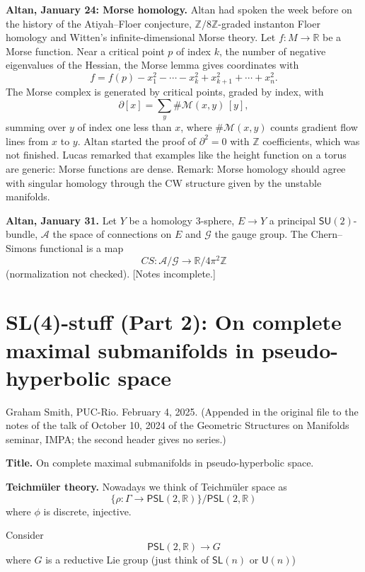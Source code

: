 \medskip\noindent
{\bf Altan, January 24: Morse homology.}
Altan had spoken the week before on the
history of the Atiyah--Floer conjecture,
$\mathbb{Z}/8\mathbb{Z}$-graded instanton
Floer homology and Witten's
infinite-dimensional Morse theory. Let
$f\colon M\to\mathbb{R}$ be a Morse
function. Near a critical point $p$ of index
$k$, the number of negative eigenvalues of
the Hessian, the Morse lemma gives
coordinates with
$$
f=f(p)-x_1^2-\cdots-x_k^2
+x_{k+1}^2+\cdots+x_n^2.
$$
The Morse complex is generated by critical
points, graded by index, with
$$
\partial[x]=\sum_y
\#\mathcal{M}(x,y)\,[y],
$$
summing over $y$ of index one less than $x$,
where $\#\mathcal{M}(x,y)$ counts gradient
flow lines from $x$ to $y$. Altan started
the proof of $\partial^2=0$ with
$\mathbb{Z}$ coefficients, which was not
finished. Lucas remarked that examples like
the height function on a torus are generic:
Morse functions are dense. Remark:
Morse homology should agree with singular
homology through the CW structure given by
the unstable manifolds.

\medskip\noindent
{\bf Altan, January 31.} Let $Y$ be a
homology $3$-sphere, $E\to Y$ a principal
$\mathsf{SU}(2)$-bundle, $\mathcal{A}$ the
space of connections on $E$ and
$\mathcal{G}$ the gauge group. The
Chern--Simons functional is a map
$$
CS\colon\mathcal{A}/\mathcal{G}\to
\mathbb{R}/4\pi^2\mathbb{Z}
$$
(normalization not checked).
[Notes incomplete.]

\section{SL(4)-stuff (Part 2): On complete
maximal submanifolds in pseudo-hyperbolic
space}
\label{section-smith-maximal-submanifolds}

\noindent
Graham Smith, PUC-Rio. February 4, 2025.
(Appended in the original file to the notes
of the talk of October 10, 2024 of the
Geometric Structures on Manifolds seminar,
IMPA; the second header gives no series.)

\medskip\noindent
{\bf Title.}
On complete maximal submanifolds in
pseudo-hyperbolic space.

\medskip\noindent
{\bf Teichmüler theory.}
Nowadays we think of Teichmüler space as
$$\{ \rho: \Gamma\to
\mathsf{PSL}(2,\mathbb{R}) \} \Big/
\mathsf{PSL}(2,\mathbb{R})$$
where $\phi$ is discrete, injective.

Consider
$$\mathsf{PSL}(2,\mathbb{R})\to G$$
where $G$ is a reductive Lie group
(just think of $\mathsf{SL}(n)$ or
$\mathsf{U}(n)$)

